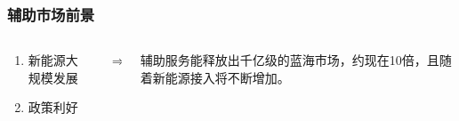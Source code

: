 \documentclass[aspectratio=43, 10pt, utf8, mathserif]{beamer}
\begin{document}
	
%	
%	
%		
%			
	
	
	\begin{frame}
		\frametitle{辅助市场前景}
	
	
		
		\begin{columns}
			\begin{column}{.475\linewidth}
				\begin{enumerate}
					\item 新能源大规模发展
					\item 政策利好
				\end{enumerate}
			\end{column}
			\begin{column}{0.05\linewidth}
				\textbf{$ \Rightarrow $}
			\end{column}
			\begin{column}{0.475\linewidth}
				辅助服务能释放出千亿级的蓝海市场，约现在10倍，且随着新能源接入将不断增加。
			\end{column}
		\end{columns}
		
		
	\end{frame}
	
\end{document}
